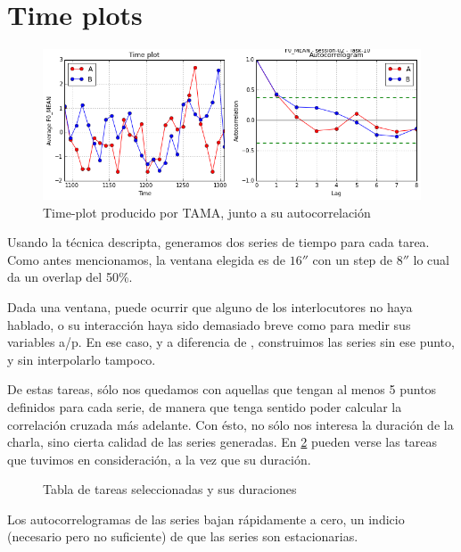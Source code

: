 \section{Time plots}

\begin{figure}
\centering
\includegraphics[width=15cm]{images/time_plot_with_autocorrelation.png}
\caption{Time-plot producido por TAMA, junto a su autocorrelación \label{time_plot}}

\end{figure}

Usando la técnica descripta, generamos dos series de tiempo para cada tarea. Como antes mencionamos, la ventana elegida es de $16''$ con un step de $8''$ lo cual da un overlap del 50\%.

Dada una ventana, puede ocurrir que alguno de los interlocutores no haya hablado, o su interacción haya sido demasiado breve como para medir sus variables a/p. En ese caso, y a diferencia de \cite{KOU2008}, construimos las series sin ese punto, y sin interpolarlo tampoco.


De estas tareas, sólo nos quedamos con aquellas que tengan al menos 5 puntos definidos para cada serie, de manera que tenga sentido poder calcular la correlación cruzada más adelante. Con ésto, no sólo nos interesa la duración de la charla, sino cierta calidad de las series generadas. En \ref{time_series_table} pueden verse las tareas que tuvimos en consideración, a la vez que su duración.


\begin{figure}
\centering

\label{time_series_table}
\caption{Tabla de tareas seleccionadas y sus duraciones}
\end{figure}

Los autocorrelogramas de las series bajan rápidamente a cero, un indicio (necesario pero no suficiente) de que las series son estacionarias.

